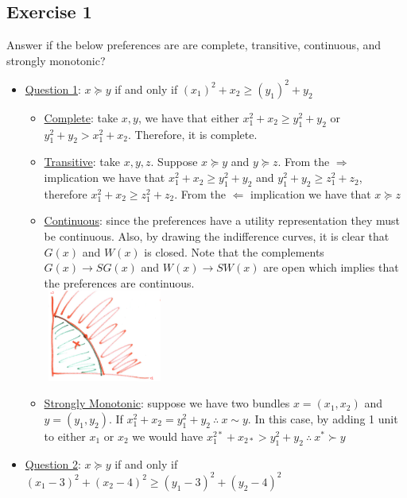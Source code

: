 \documentclass{article}
\begin{document}
\subsection{Exercise 1}
Answer if the below preferences are are complete, transitive, continuous, and strongly monotonic? \par \vspace{0.3em}
  \begin{itemize}
    \item  \underline{Question 1}: $x \succeq y$ if and only if $(x_{1})^{2} + x_{2} \geq (y_{1})^{2} + y_{2}$
    \begin{itemize}
      \item  \underline{Complete}: take $x,y$, we have that either $x_{1}^{2} + x_{2} \geq y_{1}^{2} + y_{2}$ or $y_{1}^{2} + y_{2} > x_{1}^{2} + x_{2}$. Therefore, it is complete.
      \item  \underline{Transitive}: take $x,y,z$. Suppose $x \succeq y$ and $y \succeq z$. From the $\Rightarrow$ implication we have that $x_{1}^{2} + x_{2} \geq y_{1}^{2} + y_{2}$ and $y_{1}^{2} + y_{2} \geq z_{1}^{2} + z_{2}$, therefore $x_{1}^{2} + x_{2} \geq z_{1}^{2} + z_{2}$. From the $\Leftarrow$ implication we have that $x \succeq z$
      \item  \underline{Continuous}: since the preferences have a utility representation they must be continuous. Also, by drawing the indifference curves, it is clear that $G(x)$ and $W(x)$ is closed. Note that the complements $G(x) \rightarrow SG(x)$ and $W(x) \rightarrow SW(x)$ are open which implies that the preferences are continuous. \\
      \includegraphics[width=4cm, height=3cm]{pic20}
      \item  \underline{Strongly Monotonic}: suppose we have two bundles $x = (x_{1}, x_{2})$ and $y = (y_{1}, y_{2})$. If $x_{1}^{2} + x_{2} = y_{1}^{2} + y_{2} \ \therefore \ x \sim y$. In this case, by adding 1 unit to either $x_{1}$ or $x_{2}$ we would have $x_{1}^{2*} + x_{2*} > y_{1}^{2} + y_{2} \ \therefore \ x^{*} \succ y$
    \end{itemize}
    \item  \underline{Question 2}: $x \succeq y$ if and only if $(x_{1} - 3)^{2} + (x_{2} - 4)^{2} \geq (y_{1} - 3)^{2} + (y_{2}-4)^{2}$

\end{itemize}
\end{document}
